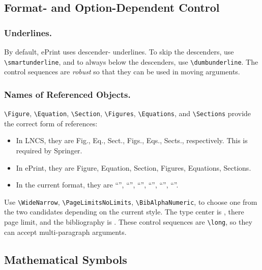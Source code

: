\subsection{Format- and Option-Dependent Control }

\subsubsection{Underlines.}
By default, ePrint uses descender- underlines.
To  skip the descenders,
use \texttt{\textbackslash smartunderline}, and
to always  below the descenders,
use \texttt{\textbackslash dumbunderline}.
The control sequences are \emph{robust} so that
they can be used in moving arguments.

\subsubsection{Names of Referenced Objects.}
\texttt{\textbackslash Figure},
\texttt{\textbackslash Equation},
\texttt{\textbackslash Section},
\texttt{\textbackslash Figures},
\texttt{\textbackslash Equations}, and
\texttt{\textbackslash Sections}
provide the correct form of references:
\begin{itemize}
\item
In LNCS, they are Fig., Eq., Sect., Figs., Eqs., Sects., respectively.
This is required by Springer.
\item
In ePrint, they are Figure, Equation, Section, Figures, Equations, Sections.
\item
In the current format, they are
``\Figure'', ``\Equation'', ``\Section'',
``\Figures'', ``\Equations'', ``\Sections''.
\end{itemize}
Use
\texttt{\textbackslash WideNarrow},
\texttt{\textbackslash PageLimitsNoLimits},
\texttt{\textbackslash BibAlphaNumeric},
to choose one from the two candidates depending on the current style.
The type center is ,
there  page limit,
and the bibliography is .
These control sequences are \texttt{\textbackslash long},
so they can accept multi-paragraph arguments.

\subsection{Mathematical Symbols}

